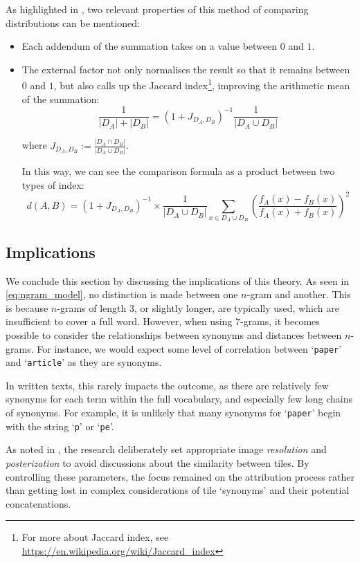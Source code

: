 \noindent As highlighted in \cite{thesis}, two relevant properties of this method of comparing distributions can be mentioned:
\begin{itemize}
	\item Each addendum of the summation takes on a value between $0$ and $1$.
	\item The external factor not only normalises the result so that it remains between $0$ and $1$, but also calls up the Jaccard index\footnote{For more about Jaccard index, see \url{https://en.wikipedia.org/wiki/Jaccard_index}}, improving the arithmetic mean of the summation:
	\[
		\frac{1}{|D_A|+|D_B|} = (1+J_{D_A,D_B})^{-1}\frac{1}{|D_A\cup D_B|}
	\]
	\begin{toReview}
		\noindent where $J_{D_A,D_B} := \frac{\left|D_A\cap D_B\right|}{\left|D_A\cup D_B\right|}$.

		\noindent In this way, we can see the comparison formula as a product between two types of index:
		\[
			d(A,B)=(1+J_{D_A, D_B})^{-1} \times \frac{1}{\left|D_A\cup D_B\right|}\sum_{x\in D_A\cup D_B}\left(\frac{f_A(x)-f_B(x)}{f_A(x)+f_B(x)}\right)^2
		\]
	\end{toReview}
\end{itemize}

\subsection{Implications}
We conclude this section by discussing the implications of this theory. As seen in \cref{eq:ngram_model}, no distinction is made between one $n$-gram and another. This is because $n$-grams of length 3, or slightly longer, are typically used, which are insufficient to cover a full word. However, when using $7$-grams, it becomes possible to consider the relationships between synonyms and distances between $n$-grams. For instance, we would expect some level of correlation between ‘\texttt{paper}’ and ‘\texttt{article}’ as they are synonyms.

\noindent In written texts, this rarely impacts the outcome, as there are relatively few synonyms for each term within the full vocabulary, and especially few long chains of synonyms. For example, it is unlikely that many synonyms for ‘\texttt{paper}’ begin with the string ‘\texttt{p}’ or ‘\texttt{pe}’.

\noindent As noted in \cite{thesis}, the research deliberately set appropriate image \textit{resolution} and \textit{posterization} to avoid discussions about the similarity between tiles. By controlling these parameters, the focus remained on the attribution process rather than getting lost in complex considerations of tile ‘synonyms’ and their potential concatenations.

